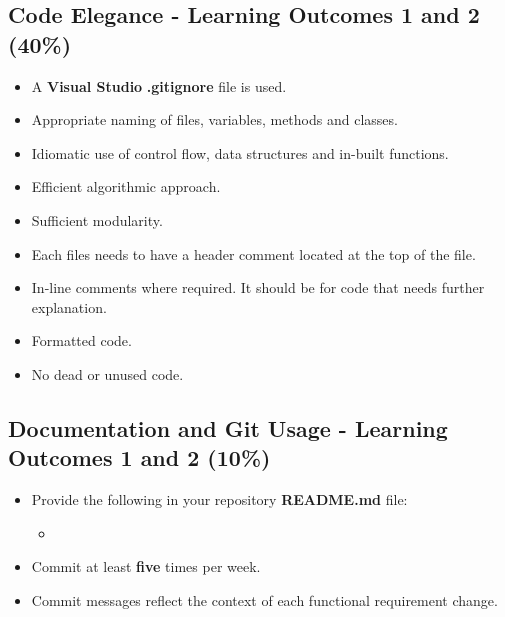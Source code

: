 \documentclass{article}
\begin{document}
\subsection*{Code Elegance - Learning Outcomes 1 and 2  (40\%)}
\begin{itemize}
    \item A \textbf{Visual Studio} \textbf{.gitignore} file is used. 
    \item Appropriate naming of files, variables, methods and classes.
    \item Idiomatic use of control flow, data structures and in-built functions.
    \item Efficient algorithmic approach.
    \item Sufficient modularity.
    \item Each files needs to have a header comment located at the top of the file.
    \item In-line comments where required. It should be for code that needs further explanation.
    \item Formatted code.
    \item No dead or unused code. 
\end{itemize}

\subsection*{Documentation and Git Usage - Learning Outcomes 1 and 2 (10\%)}
\begin{itemize}
    \item Provide the following in your repository \textbf{README.md} file:
    \begin{itemize}
        \item 
    \end{itemize}
    \item Commit at least \textbf{five} times per week.
    \item Commit messages reflect the context of each functional requirement change.
\end{itemize}
\end{document}
